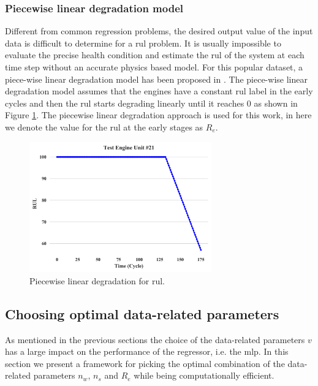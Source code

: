 \documentclass{article}
\begin{document}
\subsubsection{Piecewise linear degradation model}

Different from common regression problems, the desired output value of the input data is difficult to determine for a \gls{rul} problem. It is usually impossible to evaluate the precise health condition and estimate the \gls{rul} of the system at each time step without an accurate physics based model. For this popular dataset, a piece-wise linear degradation model has been proposed in \cite{Ramasso2014}. The piece-wise linear degradation model assumes that the engines have a constant \gls{rul} label in the early cycles and then the \gls{rul} starts degrading linearly until it reaches 0 as shown in Figure \ref{fig:piecewise_model}. The piecewise linear degradation approach is used for this work, in here we denote the value for the \gls{rul} at the early stages as $R_e$. 

\begin{figure}[!htb]
\centering
\includegraphics[width=0.7\textwidth]{../img/test_engine.png}
\caption{Piecewise linear degradation for \gls{rul}.}
\label{fig:piecewise_model}
\end{figure}

\subsection{Choosing optimal data-related parameters}
\label{sec:choosing_otimal_data-related_params}

As mentioned in the previous sections the choice of the data-related parameters $v$ has a large impact on the performance of the regressor, i.e. the \gls{mlp}. In this section we present a framework for picking the optimal combination of the data-related parameters $n_w$, $n_s$ and $R_e$ while being computationally efficient.
\end{document}
